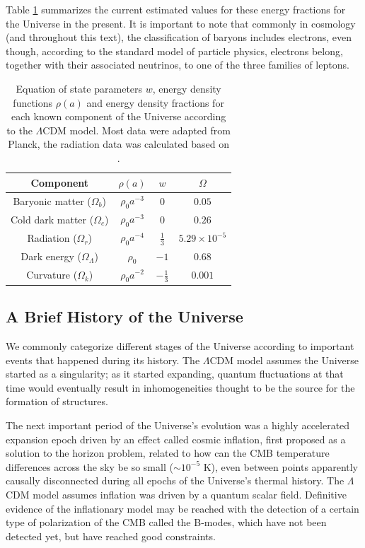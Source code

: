 \documentclass[openany,a4paper,12pt,oneside]{book}
\begin{document}
\begin{spacing}{1.5}
Table \ref{tab:rhos&Omegas} summarizes the current estimated values for these energy fractions for the Universe in the present. It is important to note that commonly in cosmology (and throughout this text), the classification of baryons includes electrons, even though, according to the standard model of particle physics, electrons belong, together with their associated neutrinos, to one of the three families of leptons.

\begin{table}[!htb]
\centering
    \begin{tabular}{cccc} \hline
     Component & $\rho(a)$ & $w$ & $\Omega$ \\ \hline
     Baryonic matter ($\Omega_b$) & $\rho_0a^{-3}$ & $0$ & $0.05$\\
     Cold dark matter ($\Omega_c$) & $\rho_0a^{-3}$ & $0$ & $0.26$ \\
     Radiation ($\Omega_r$) & $\rho_0a^{-4}$ & $\frac{1}{3}$ & $5.29\times 10^{-5}$\\
     Dark energy ($\Omega_\Lambda$) & $\rho_0$ & $-1$ & $0.68$\\
     Curvature ($\Omega_k$) & $\rho_0 a^{-2}$ & $-\frac{1}{3}$ & $0.001$\\ \hline
    \end{tabular}
    \caption{Equation of state parameters $w$, energy density functions $\rho(a)$ and energy density fractions for each known component of the Universe according to the $\Lambda$CDM model. Most data were adapted from Planck\cite{Planck_results}, the radiation data was calculated based on \cite{lahav2014cosmological}.}
    \label{tab:rhos&Omegas}
\end{table}

\subsection{A Brief History of the Universe}

We commonly categorize different stages of the Universe according to important events that happened during its history. The $\Lambda$CDM model assumes the Universe started as a singularity; as it started expanding, quantum fluctuations at that time would eventually result in inhomogeneities thought to be the source for the formation of structures.

The next important period of the Universe's evolution was a highly accelerated expansion epoch driven by an effect called cosmic inflation, first proposed as a solution to the horizon problem\cite{Guth81,linde82}, related to how can the CMB temperature differences across the sky be so small ($\sim 10^{-5}$ K), even between points apparently causally disconnected during all epochs of the Universe's thermal history. The $\Lambda$CDM model assumes inflation was driven by a quantum scalar field\cite{dodelson2020modern}. Definitive evidence of the inflationary model may be reached with the detection of a certain type of polarization of the CMB called the B-modes, which have not been detected yet, but have reached good constraints.\cite{BMode_constraints}


\end{spacing}
\end{document}
